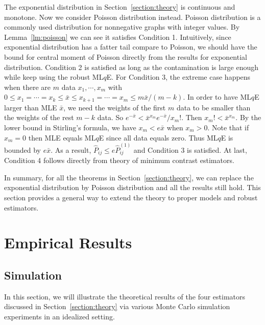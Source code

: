 \documentclass[a4paper]{article}
\renewcommand{\hat}{\widehat}
\begin{document}
The exponential distribution in Section~\ref{section:theory} is continuous and monotone. Now we consider Poisson distribution instead. Poisson distribution is a commonly used distribution for nonnegative graphs with integer values. By Lemma~\ref{lm:poisson} we can see it satisfies Condition 1. Intuitively, since exponential distribution has a fatter tail compare to Poisson, we should have the bound for central moment of Poisson directly from the results for exponential distribution. Condition 2 is satisfied as long as the contamination is large enough while keep using the robust ML$q$E. For Condition 3, the extreme case happens when there are $m$ data $x_1, \cdots, x_m$ with $0 \le x_1 = \cdots = x_k \le \bar{x} \le x_{k+1} = \cdots = x_m \le m \bar{x}/(m - k)$. In order to have ML$q$E larger than MLE $\bar{x}$, we need the weights of the first $m$ data to be smaller than the weights of the rest $m - k$ data. So $e^{-\bar{x}} < \bar{x}^{x_m} e^{-\bar{x}} / x_m!$. Then $x_m! < \bar{x}^{x_m}$. By the lower bound in Stirling's formula, we have $x_m < e \bar{x}$ when $x_m > 0$. Note that if $x_m = 0$ then MLE equals ML$q$E since all data equals zero. Thus ML$q$E is bounded by $e \bar{x}$. As a result, $\hat{P}_{ij} \le e \hat{P}_{ij}^{(1)}$ and Condition 3 is satisfied. At last, Condition 4 follows directly from theory of minimum contrast estimators.

In summary, for all the theorems in Section~\ref{section:theory}, we can replace the exponential distribution by Poisson distribution and all the results still hold. This section provides a general way to extend the theory to proper models and robust estimators.


\section{Empirical Results}
\label{section:results}

\subsection{Simulation}
\label{section:sim}

In this section, we will illustrate the theoretical results of the four estimators discussed in Section~\ref{section:theory} via various Monte Carlo simulation experiments in an idealized setting.
\end{document}
